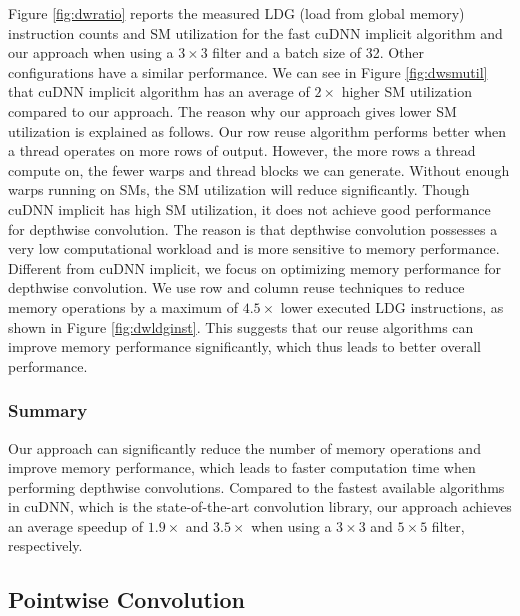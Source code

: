 Figure \ref{fig:dwratio} reports the measured LDG (load from global memory) instruction counts and SM utilization for the fast cuDNN implicit algorithm and our approach when using a $3 \times 3$ filter and a batch size of 32. Other configurations have a similar performance. 
We can see in Figure \ref{fig:dwsmutil} that cuDNN implicit algorithm has an average of $2\times$ higher SM utilization compared to our approach.
The reason why our approach gives lower SM utilization is explained as follows. 
Our row reuse algorithm performs better when a thread operates on more rows of output.
However, the more rows a thread compute on, the fewer warps and thread blocks we can generate. Without enough warps running on SMs, the SM utilization will reduce significantly.
Though cuDNN implicit has high SM utilization, it does not achieve good performance for depthwise convolution. 
The reason is that depthwise convolution possesses a very low computational workload and is more sensitive to memory performance.
Different from cuDNN implicit, we focus on optimizing memory performance for depthwise convolution. We use row and column reuse techniques to reduce memory operations by a maximum of $4.5\times$ lower executed LDG instructions, as shown in Figure \ref{fig:dwldginst}.
This suggests that our reuse algorithms can improve memory performance significantly, which thus leads to better overall performance.

\subsubsection{Summary}
Our approach can significantly reduce the number of memory operations and improve memory performance, which leads to faster computation time when performing depthwise convolutions.  
Compared to the fastest available algorithms in cuDNN, which is the state-of-the-art convolution library, our approach achieves an average speedup of $1.9\times$ and $3.5\times$ when using a $3 \times 3$ and $5 \times 5$ filter, respectively.


\subsection{Pointwise Convolution}
\label{sec:pwconvexp}

